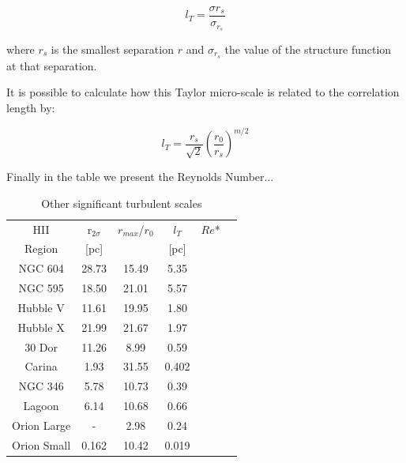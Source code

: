 \documentclass[fleqn,usenatbib, useAMS, a4paper]{mnras}
\begin{document}
\begin{equation}\label{eq:TS}
l_T=\dfrac{\sigma r_s}{\sigma_{r_s}}
\end{equation}

where \(r_s\) is the smallest separation \(r\) and \(\sigma_{r_s}\) the value of the structure function at that separation. 

It is possible to calculate how this Taylor micro-scale is related to the correlation length by:

\begin{equation}\label{eq:TS1}
l_T=\dfrac{r_s}{\sqrt{2}}(\dfrac{r_0}{r_s})^{m/2}
\end{equation}  

Finally in the table we present the Reynolds Number...

\begin{table}
\begin{center}\caption{Other significant turbulent scales}
\begin{tabular}{cccccc}\hline
HII         &r$_{2\sigma}$ &\(r_{max}\)/\(r_0\)  &\(l_T\) & \(Re\)* \\
Region      &[pc]          &                     &[pc]    &   \\ \hline
NGC 604     &28.73         &15.49                &5.35    &   \\
NGC 595     &18.50         &21.01                &5.57    &   \\
Hubble V    &11.61         &19.95                &1.80    &   \\ 
Hubble X    &21.99         &21.67                &1.97    &   \\   
30 Dor      &11.26         &8.99                 &0.59    &   \\
Carina      &1.93          &31.55                &0.402   &   \\
NGC 346     &5.78          &10.73                &0.39    &   \\
Lagoon      &6.14          &10.68                &0.66    &   \\ 
Orion Large &-             &2.98                 &0.24    &   \\
Orion Small &0.162         &10.42                &0.019   &   \\ \hline	  
\end{tabular}\label{tab:ResII}
\end{center}
\end{table}  
\end{document}

